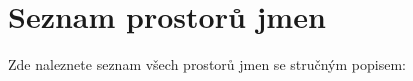 \section{Seznam prostorů jmen}
Zde naleznete seznam všech prostorů jmen se stručným popisem\+:\begin{DoxyCompactList}
\item{}
\end{DoxyCompactList}
